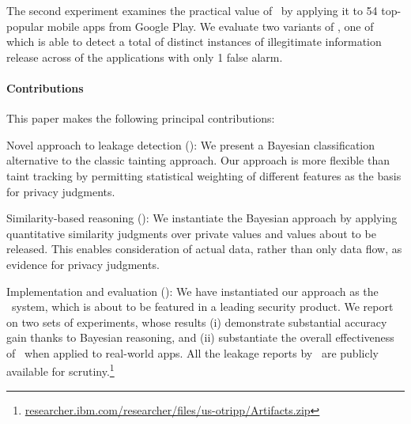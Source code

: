 The second experiment examines the practical value of \Tool\ by applying it to 54 top-popular mobile apps from Google Play. We evaluate two variants of \Tool, one of which is able to detect a total of  distinct instances of illegitimate information release across  of the applications with only 1 false alarm.

\paragraph{Contributions} This paper makes the following principal contributions:
\begin{compactenum}
	\item Novel approach to leakage detection (): We present a Bayesian classification alternative to the classic tainting approach. Our approach is more flexible than taint
	tracking by permitting statistical weighting of different features as the basis for privacy judgments.
	\item Similarity-based reasoning (): We instantiate the Bayesian approach by applying quantitative similarity judgments over private values and values
	about to be released. This enables consideration of actual data, rather than only data flow, as evidence for privacy judgments.
	\item Implementation and evaluation (): We have instantiated our approach as the \Tool\ system, which is about to be featured in a leading security product. We report on two sets of experiments, whose results (i) demonstrate substantial accuracy gain thanks to Bayesian reasoning, and (ii) substantiate the overall effectiveness of \Tool\ when applied to real-world apps. All the leakage reports by \Tool\ are publicly available for scrutiny.\footnote{
		 \href{researcher.ibm.com/researcher/files/us-otripp/Artifacts.zip}{researcher.ibm.com/researcher/files/us-otripp/Artifacts.zip}
	}
\end{compactenum}









